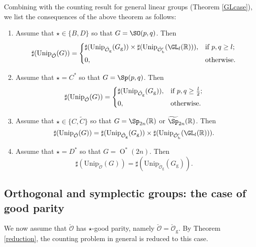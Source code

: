 \documentclass[12pt,a4paper]{amsart}
\newcommand{\CO}{{\mathcal {O}}}
\newcommand{\oO}{\operatorname{O}}
\newcommand{\R}{\mathbb R}
\numberwithin{equation}{section}
\theoremstyle{remark}
\def\Unip{\mathrm{Unip}}
\begin{document}
Combining with the counting result for general linear groups (Theorem \ref{GLcase}), we list the consequences of the
above theorem as follows:
\begin{enumerate}[label=(\alph*)]
  \item Assume that $\star\in \{B,D\}$ so that $G=\SO(p,q)$. Then
        \[
        \sharp(\Unip_{\check \CO}(G))=
        \begin{cases}
          \sharp(\Unip_{\check \CO_{\mathrm g}}(G_{\mathrm g}))\times \sharp(\Unip_{\check \CO'_{\mathrm b}}(\GL_l(\R)) ), &\hbox{if $p,q\geq l$}; \smallskip\\
          0, &\hbox{otherwise.}
        \end{cases}
        \]
  \item Assume that $\star=C^*$ so that $G=\Sp(p,q)$. Then
        \[
        \sharp(\Unip_{\check \CO}(G))=
        \begin{cases}
          \sharp(\Unip_{\check \CO_{\mathrm g}}(G_{\mathrm g} )), &\hbox{if $p,q\geq \frac{l}{2}$}; \smallskip\\
          0, &\hbox{otherwise.}
        \end{cases}
        \]

  \item Assume that $\star\in \{C,\widetilde C\}$ so that $G=\Sp_{2n}(\R)$ or
        $\widetilde \Sp_{2n}(\R)$. Then
        \[
        \sharp(\Unip_{\check \CO}(G))= \sharp(\Unip_{\check \CO_{\mathrm g}}(G_{\mathrm g}))\times \sharp(\Unip_{\check \CO'_{\mathrm b}}(\GL_l(\R)) ). \]
  \item Assume that $\star =D^*$ so that $G=\oO^*(2n)$. Then
        \[
          \sharp(\Unip_{\check \CO}(G))= \sharp(\Unip_{\check \CO_{\mathrm g}}(G_{\mathrm g})).
        \]
\end{enumerate}


 \subsection{Orthogonal and symplectic groups: the case of good parity}\label{secorgp0}
 We now assume that $\check \CO$ has $\star$-good parity, namely
 $\check \CO=\check \CO_{\mathrm g}$. By Theorem \ref{reduction}, the counting
 problem in general is reduced to this case.
\end{document}
